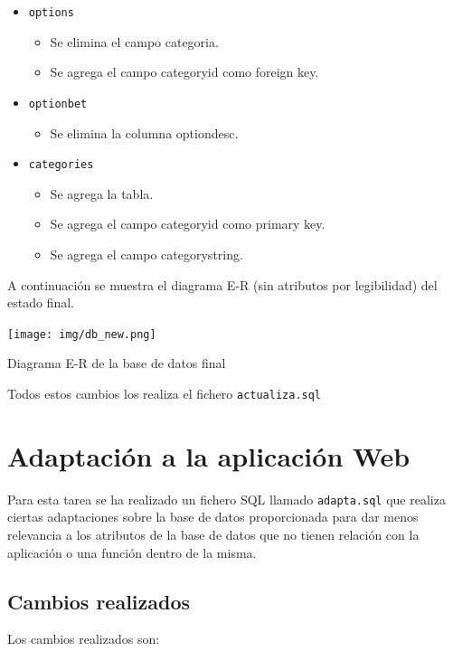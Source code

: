 \documentclass{article}
\begin{document}
\begin{itemize}
\begin{itemize}
        \end{itemize}
    \item\texttt{options}
        \begin{itemize}
            \item Se elimina el campo categoria.
            \item Se agrega el campo categoryid como foreign key.
        \end{itemize}
    \item\texttt{optionbet}
        \begin{itemize}
            \item Se elimina la columna optiondesc.
        \end{itemize}
    \item\texttt{categories}
        \begin{itemize}
            \item Se agrega la tabla.
            \item Se agrega el campo categoryid como primary key.
            \item Se agrega el campo categorystring.
        \end{itemize}
\end{itemize}
\newpage
A continuación se muestra el diagrama E-R (sin atributos por legibilidad) del estado final.
\smallbreak
\begin{minipage}{\linewidth}
    \centering
    \captionsetup{type=figure}
    \texttt{[image: img/db\_new.png]}
    \caption{Diagrama E-R de la base de datos final}
    \label{fig:fig2}
\end{minipage}

Todos estos cambios los realiza el fichero \texttt{actualiza.sql}

\section{Adaptación a la aplicación Web}
Para esta tarea se ha realizado un fichero SQL llamado \texttt{adapta.sql} que realiza ciertas adaptaciones sobre la base de datos proporcionada para dar menos relevancia a los atributos de la base de datos que no tienen relación con la aplicación o una función dentro de la misma.

\subsection{Cambios realizados}
Los cambios realizados son:
\end{document}
